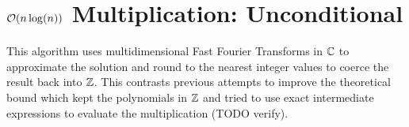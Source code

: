



\section{$\mathcal O(n\log(n))$ Multiplication: Unconditional}
\label{subsec:nlogn}

This algorithm uses multidimensional Fast Fourier Transforms in ${\mathbb C}$ to approximate the solution and round to the nearest integer values to coerce the result back into ${\mathbb Z}$. This contrasts previous attempts to improve the theoretical bound which kept the polynomials in ${\mathbb Z}$ and tried to use exact intermediate expressions to evaluate the multiplication (TODO verify).

